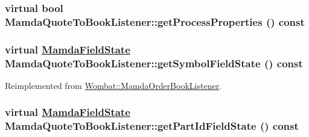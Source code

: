 \hypertarget{classMamdaQuoteToBookListener_bdb5217044b44ba5fbe07ad75721743a}{
\subsubsection[getProcessProperties]{\setlength{\rightskip}{0pt plus 5cm}virtual bool Mamda\-Quote\-To\-Book\-Listener::get\-Process\-Properties () const}}
\label{classMamdaQuoteToBookListener_bdb5217044b44ba5fbe07ad75721743a}


\hypertarget{classMamdaQuoteToBookListener_6be1e25a1f340cf0142816c7cdb3d593}{
\subsubsection[getSymbolFieldState]{\setlength{\rightskip}{0pt plus 5cm}virtual \hyperlink{namespaceWombat_93aac974f2ab713554fd12a1fa3b7d2a}{Mamda\-Field\-State} Mamda\-Quote\-To\-Book\-Listener::get\-Symbol\-Field\-State () const}}
\label{classMamdaQuoteToBookListener_6be1e25a1f340cf0142816c7cdb3d593}




Reimplemented from \hyperlink{classWombat_1_1MamdaOrderBookListener_ed48775d67d2806a1d78fbf5310f7a5b}{Wombat::Mamda\-Order\-Book\-Listener}.\hypertarget{classMamdaQuoteToBookListener_7c760a83b876e17c52537cbd885697d5}{
\subsubsection[getPartIdFieldState]{\setlength{\rightskip}{0pt plus 5cm}virtual \hyperlink{namespaceWombat_93aac974f2ab713554fd12a1fa3b7d2a}{Mamda\-Field\-State} Mamda\-Quote\-To\-Book\-Listener::get\-Part\-Id\-Field\-State () const}}
\label{classMamdaQuoteToBookListener_7c760a83b876e17c52537cbd885697d5}




